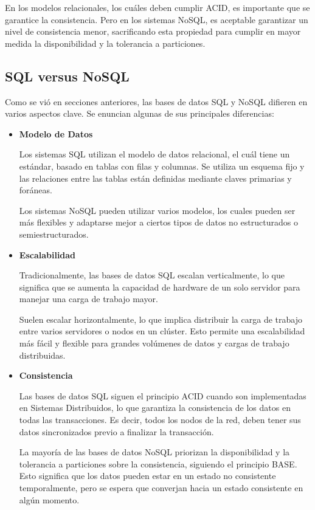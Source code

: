 \documentclass[pdflatex,sn-mathphys-num]{sn-jnl}
\theoremstyle{thmstyleone}%
\theoremstyle{thmstyletwo}%
\theoremstyle{thmstylethree}%
\begin{document}
En los modelos relacionales, los cuáles deben cumplir ACID, es importante que se garantice la consistencia. Pero en los sistemas NoSQL, es aceptable garantizar un nivel de consistencia menor, sacrificando esta propiedad para cumplir en mayor medida la disponibilidad y la tolerancia a particiones.

\subsection{SQL versus NoSQL}\label{sec33}

Como se vió en secciones anteriores, las bases de datos SQL y NoSQL difieren en varios aspectos clave. Se enuncian algunas de sus principales diferencias:

\begin{itemize}
    \item \textbf{Modelo de Datos}

    Los sistemas SQL utilizan el modelo de datos relacional, el cuál tiene un estándar, basado en tablas con filas y columnas. Se utiliza un esquema fijo y las relaciones entre las tablas están definidas mediante claves primarias y foráneas.

    Los sistemas NoSQL pueden utilizar varios modelos, los cuales pueden ser más flexibles y adaptarse mejor a ciertos tipos de datos no estructurados o semiestructurados.

    \item \textbf{Escalabilidad}
    
    Tradicionalmente, las bases de datos SQL escalan verticalmente, lo que significa que se aumenta la capacidad de hardware de un solo servidor para manejar una carga de trabajo mayor. 
    
    Suelen escalar horizontalmente, lo que implica distribuir la carga de trabajo entre varios servidores o nodos en un clúster. Esto permite una escalabilidad más fácil y flexible para grandes volúmenes de datos y cargas de trabajo distribuidas.
    
    \item \textbf{Consistencia}
    
    Las bases de datos SQL siguen el principio ACID cuando son implementadas en Sistemas Distribuidos, lo que garantiza la consistencia de los datos en todas las transacciones. Es decir, todos los nodos de la red, deben tener sus datos sincronizados previo a finalizar la transacción.
    
    La mayoría de las bases de datos NoSQL priorizan la disponibilidad y la tolerancia a particiones sobre la consistencia, siguiendo el principio BASE. Esto significa que los datos pueden estar en un estado no consistente temporalmente, pero se espera que converjan hacia un estado consistente en algún momento.


\end{itemize}
\end{document}
